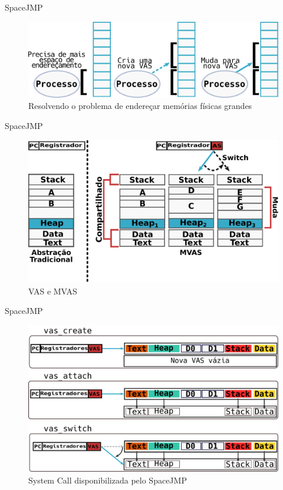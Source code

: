 \documentclass[xcolor={usenames,svgnames,dvipsnames},brazil,english,12pt,aspectratio=149]{beamer}
\begin{document}
\begin{frame}{SpaceJMP}
  \begin{figure}[!h]
    \centering
    \includegraphics[width=.7\textwidth]{solve_huge_address_memory}
    \caption{Resolvendo o problema de endereçar memórias físicas grandes}
    \label{fig:large_memory}
  \end{figure}
\end{frame}

\begin{frame}{SpaceJMP}
  \begin{figure}[!h]
    \centering
    \includegraphics[width=.7\textwidth]{traditional_vs_mvas} 
    \caption{VAS e MVAS}
    \label{fig:traditional_vs_mvas} 
  \end{figure}
\end{frame}

\begin{frame}{SpaceJMP}
  \begin{figure}[!h]
    \centering
    \includegraphics[width=.7\textwidth]{mvas_example} 
    \caption{System Call disponibilizada pelo SpaceJMP}
    \label{fig:mvas_example}
  \end{figure}
\end{frame}
\end{document}
